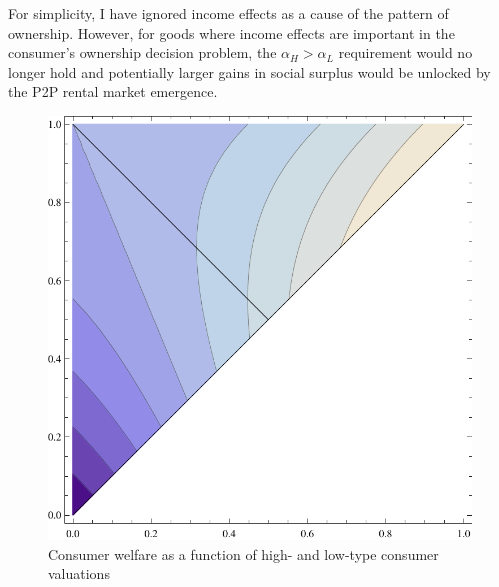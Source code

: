 \documentclass[11pt]{article}
\begin{document}
For simplicity, I have ignored income effects as a cause of the pattern of ownership. 
However, for goods where income effects are important in the consumer's ownership decision problem, the $\alpha_H > \alpha_L$ requirement would no longer hold and potentially larger gains in social surplus would be unlocked by the P2P rental market emergence. 

\begin{figure}
\centering 
\caption{Consumer welfare as a function of high- and low-type consumer valuations}
\label{fig:welfare}
\begin{minipage}{0.50 \linewidth}
\includegraphics[width = \linewidth]{./plots/welfare.pdf}
\end{minipage} 
\end{figure} 
\end{document}
